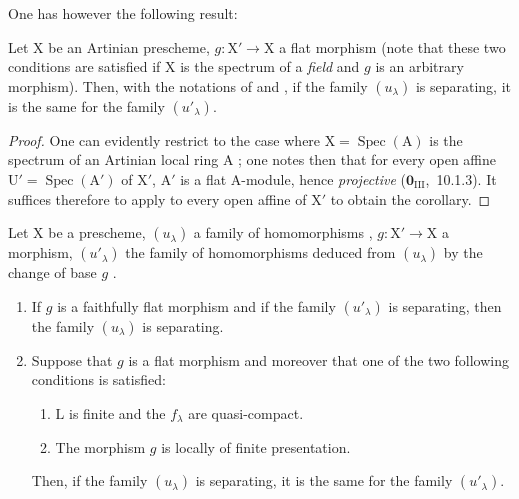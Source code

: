 One has however the following result:

\begin{corollary}[11.9.9]
\label{IV.11.9.9}
Let $\mathrm{X}$ be an Artinian prescheme, $g:\mathrm{X}'\to\mathrm{X}$ a flat morphism (note that these two conditions are satisfied if $\mathrm{X}$ is the spectrum of a \emph{field} and $g$ is an arbitrary morphism).
Then, with the notations of  and , if the family $(u_\lambda)$ is separating, it is the same for the family $(u'_\lambda)$.
\end{corollary}

\begin{proof}
One can evidently restrict to the case where $\mathrm{X}=\operatorname{Spec}(\mathrm{A})$ is the spectrum of an Artinian local ring $\mathrm{A}$ ; one notes then that for every open affine $\mathrm{U}'=\operatorname{Spec}(\mathrm{A}')$ of $\mathrm{X}'$, $\mathrm{A}'$ is a flat $\mathrm{A}$-module, hence \emph{projective} ($\mathbf{0}_{\mathrm{III}}$,~10.1.3).
It suffices therefore to apply  to every open affine of $\mathrm{X}'$ to obtain the corollary.
\end{proof}

\begin{theorem}[11.9.10]
\label{IV.11.9.10}
Let $\mathrm{X}$ be a prescheme, $(u_\lambda)$ a family of homomorphisms , $g:\mathrm{X}'\to\mathrm{X}$ a morphism, $(u'_\lambda)$ the family of homomorphisms deduced from $(u_\lambda)$ by the change of base $g$ .
\begin{enumerate}[label=(\roman*)]
  \item If $g$ is a faithfully flat morphism and if the family $(u'_\lambda)$ is separating, then the family $(u_\lambda)$ is separating.
  \item Suppose that $g$ is a flat morphism and moreover that one of the two following conditions is satisfied:
  \begin{enumerate}[label=\emph{\alph*)}]
    \item $\mathrm{L}$ is finite and the $f_\lambda$ are quasi-compact.
    \item The morphism $g$ is locally of finite presentation.
  \end{enumerate}
  Then, if the family $(u_\lambda)$ is separating, it is the same for the family $(u'_\lambda)$.
\end{enumerate}
\end{theorem}

